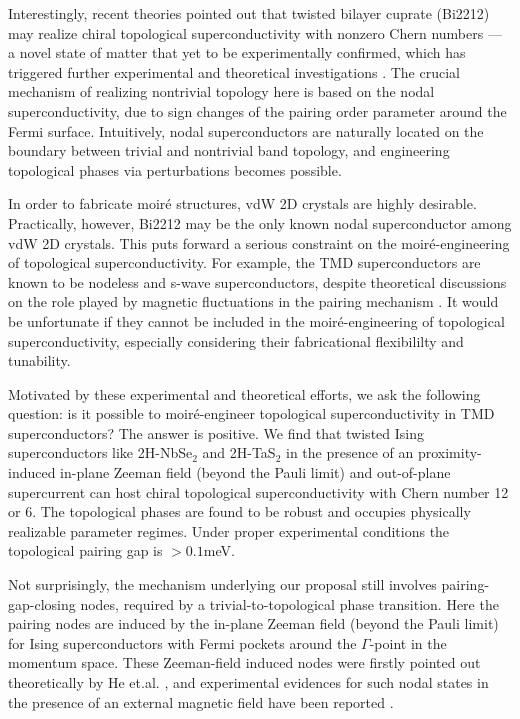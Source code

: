 Interestingly, recent theories pointed out that twisted bilayer cuprate (Bi2212) may realize chiral topological superconductivity with nonzero Chern numbers \cite{can2021high,song2021doping,zhao2021emergent} --- a novel state of matter that yet to be experimentally confirmed, which has triggered further experimental and theoretical investigations \cite{volkov2020magic,volkov2021josephson}. The crucial mechanism of realizing nontrivial topology here is based on the nodal superconductivity, due to sign changes of the pairing order parameter around the Fermi surface. Intuitively, nodal superconductors are naturally located on the boundary between trivial and nontrivial band topology, and engineering topological phases via perturbations becomes possible.

In order to fabricate moir\'{e} structures, vdW 2D crystals are highly desirable. Practically, however, Bi2212 may be the only known nodal superconductor among vdW 2D crystals. This puts forward a serious constraint on the moir\'{e}-engineering of topological superconductivity. For example, the TMD superconductors are known to be nodeless and s-wave superconductors, despite theoretical discussions on the role played by magnetic fluctuations in the pairing mechanism \cite{shaffer2020crystalline}. It would be unfortunate if they cannot be included in the moir\'{e}-engineering of topological superconductivity, especially considering their fabricational flexibililty and tunability.

Motivated by these experimental and theoretical efforts, we ask the following question: is it possible to moir\'{e}-engineer topological superconductivity in TMD superconductors? The answer is positive. We find that twisted Ising superconductors like 2H-NbSe$_2$ and 2H-TaS$_2$ in the presence of an proximity-induced in-plane Zeeman field (beyond the Pauli limit) and out-of-plane supercurrent can host chiral topological superconductivity with Chern number 12 or 6. The topological phases are found to be robust and occupies physically realizable parameter regimes. Under proper experimental conditions the topological pairing gap is $>0.1$meV.

Not surprisingly, the mechanism underlying our proposal still involves pairing-gap-closing nodes, required by a trivial-to-topological phase transition. Here the pairing nodes are induced by the in-plane Zeeman field (beyond the Pauli limit) for Ising superconductors with Fermi pockets around the $\Gamma$-point in the momentum space. These Zeeman-field induced nodes were firstly pointed out theoretically by He et.al. \cite{he2018magnetic}, and experimental evidences for such nodal states in the presence of an external magnetic field have been reported \cite{xi2016ising,xing2017ising,de2018tuning,navarro2016enhanced}.


